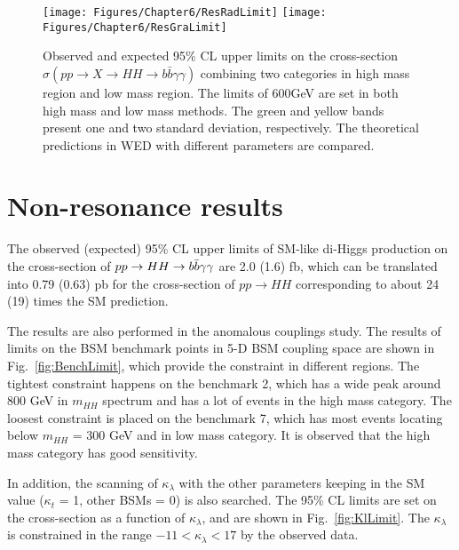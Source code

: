 \begin{figure*}[bth]
  \centering
  \texttt{[image: Figures/Chapter6/ResRadLimit]}\hfil
  \texttt{[image: Figures/Chapter6/ResGraLimit]}\hfil
  \caption{Observed and expected 95\% CL upper limits on the cross-section $\sigma(pp\rightarrow X \rightarrow HH \rightarrow b\bar{b}\gamma\gamma)$ combining two categories in high mass region and low mass region. The limits of 600GeV are set in both high mass and low mass methods. The green and yellow bands present one and two standard deviation, respectively. The theoretical predictions in WED with different parameters are compared.}
  \label{fig:ResLimit}
\end{figure*}



\section{Non-resonance results}

The observed (expected) 95\% CL upper limits of SM-like di-Higgs production on the cross-section of $pp \rightarrow HH\to b\bar{b}\gamma\gamma$ are 2.0 (1.6) fb, which can be translated into 0.79 (0.63) pb for the cross-section of $pp \rightarrow HH$ corresponding to about 24 (19) times the SM prediction.

The results are also performed in the anomalous couplings study.
The results of limits on the BSM benchmark points in 5-D BSM coupling space are shown in Fig.~\ref{fig:BenchLimit}, which provide the constraint in different regions.
The tightest constraint happens on the benchmark 2, which has a wide peak around 800 GeV in $m_{HH}$ spectrum and has a lot of events in the high mass category.
The loosest constraint is placed on the benchmark 7, which has most events locating below $m_{HH}$ = 300 GeV and in low mass category.
It is observed that the high mass category has good sensitivity.

In addition, the scanning of $\kappa_{\lambda}$ with the other parameters keeping in the SM value ($\kappa_{t}$ = 1, other BSMs = 0) is also searched.
The 95\% CL limits are set on the cross-section as a function of $\kappa_{\lambda}$, and are shown in Fig.~\ref{fig:KlLimit}.
The $\kappa_{\lambda}$ is constrained in the range $-11 < \kappa_{\lambda} < 17$ by the observed data.

